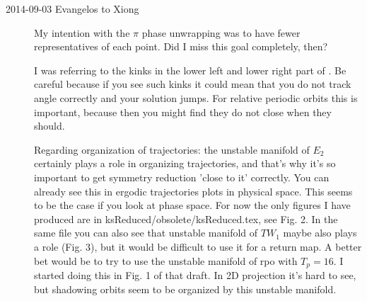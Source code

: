 \begin{description}
\item[2014-09-03 Evangelos to Xiong] My intention with the $\pi$ phase unwrapping was to
have fewer representatives of each point. Did I miss this goal completely, then?

I was referring to the kinks in the lower left and lower right part of . Be careful because
if you see such kinks it could mean that you do not track angle correctly and your solution jumps.
For relative periodic orbits this is important, because then you might find they do not close when
they should.

Regarding organization of trajectories: the unstable manifold of $E_2$ certainly plays a role in
organizing trajectories, and that's why it's so important to get symmetry reduction 'close to it'
correctly. You can already see this in ergodic trajectories plots in physical space. This seems to be the
case if you look at phase space. For now the only figures I have produced are in ksReduced/obsolete/ksReduced.tex,
see Fig. 2.
In the same file you can also see that unstable manifold of $TW_1$ maybe also plays a role (Fig. 3), but it would be difficult
to use it for a return map. A better bet would be to try to use the unstable manifold of rpo with $T_p=16$.
I started doing this in Fig. 1 of that draft. In 2D projection it's hard to see, but shadowing orbits seem to
be organized by this unstable manifold.


\end{description}
